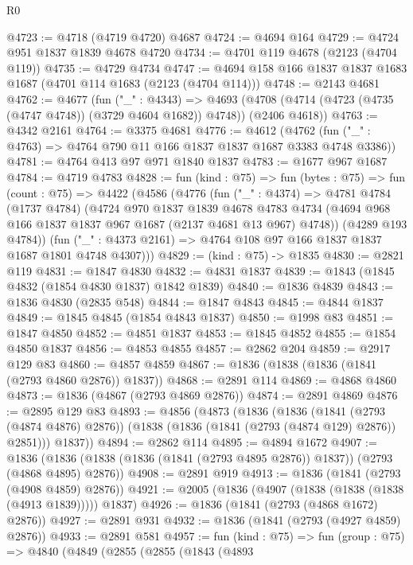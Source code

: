 \begin{lexlean}{R0}
\begin{coremodule}
@4723 := @4718 (@4719 @4720) @4687
@4724 := @4694 @164
@4729 := @4724 @951 @1837 @1839 @4678 @4720
@4734 := @4701 @119 @4678 (@2123 (@4704 @119))
@4735 := @4729 @4734
@4747 := @4694 @158 @166 @1837 @1837 @1683 @1687 (@4701 @114 @1683 (@2123 (@4704 @114)))
@4748 := @2143 @4681
@4762 := @4677
    (fun ("_" : @4343) =>
    @4693 (@4708 (@4714 (@4723 (@4735 (@4747 @4748)) (@3729 @4604 @1682)) @4748)) (@2406 @4618))
@4763 := @4342 @2161
@4764 := @3375 @4681
@4776 := @4612
    (@4762 (fun ("_" : @4763) => @4764 @790 @11 @166 @1837 @1837 @1687 @3383 @4748 @3386))
@4781 := @4764 @413 @97 @971 @1840 @1837
@4783 := @1677 @967 @1687
@4784 := @4719 @4783
@4828 := fun (kind : @75) =>
  fun (bytes : @75) =>
  fun (count : @75) =>
  @4422
    (@4586
      (@4776
        (fun ("_" : @4374) =>
        @4781
          @4784
          (@1737 @4784)
          (@4724
            @970
            @1837
            @1839
            @4678
            @4783
            @4734
            (@4694 @968 @166 @1837 @1837 @967 @1687 (@2137 @4681 @13 @967) @4748))
          (@4289 @193 @4784))
        (fun ("_" : @4373 @2161) => @4764 @108 @97 @166 @1837 @1837 @1687 @1801 @4748 @4307)))
@4829 := (kind : @75) -> @1835
@4830 := @2821 @119
@4831 := @1847 @4830
@4832 := @4831 @1837
@4839 := @1843 (@1845 @4832 (@1854 @4830 @1837) @1842 @1839)
@4840 := @1836 @4839
@4843 := @1836 @4830 (@2835 @548)
@4844 := @1847 @4843
@4845 := @4844 @1837
@4849 := @1845 @4845 (@1854 @4843 @1837)
@4850 := @1998 @83
@4851 := @1847 @4850
@4852 := @4851 @1837
@4853 := @1845 @4852
@4855 := @1854 @4850 @1837
@4856 := @4853 @4855
@4857 := @2862 @204
@4859 := @2917 @129 @83
@4860 := @4857 @4859
@4867 := @1836 (@1838 (@1836 (@1841 (@2793 @4860 @2876)) @1837))
@4868 := @2891 @114
@4869 := @4868 @4860
@4873 := @1836 (@4867 (@2793 @4869 @2876))
@4874 := @2891 @4869
@4876 := @2895 @129 @83
@4893 := @4856
    (@4873
      (@1836
        (@1836
          (@1841 (@2793 (@4874 @4876) @2876))
          (@1838 (@1836 (@1841 (@2793 (@4874 @129) @2876)) @2851)))
        @1837))
@4894 := @2862 @114
@4895 := @4894 @1672
@4907 := @1836 (@1836 (@1838 (@1836 (@1841 (@2793 @4895 @2876)) @1837)) (@2793 (@4868 @4895) @2876))
@4908 := @2891 @919
@4913 := @1836 (@1841 (@2793 (@4908 @4859) @2876))
@4921 := @2005 (@1836 (@4907 (@1838 (@1838 (@1838 (@4913 @1839))))) @1837)
@4926 := @1836 (@1841 (@2793 (@4868 @1672) @2876))
@4927 := @2891 @931
@4932 := @1836 (@1841 (@2793 (@4927 @4859) @2876))
@4933 := @2891 @581
@4957 := fun (kind : @75) =>
  fun (group : @75) =>
  @4840
    (@4849
      (@2855
        (@2855
          (@1843
            (@4893

\end{coremodule}
\end{lexlean}

